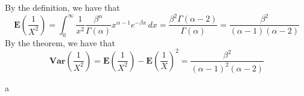 \documentclass[10.5pt]{article}
\begin{document}
\subsection{}
By the definition, we have that $$\mathbf{E}\left(\frac{1}{X^2}\right)=\int_0^{\infty}\frac{1}{x^2}\frac{\beta^\alpha}{\Gamma(\alpha)}x^{\alpha-1}e^{-\beta x}\,dx=\frac{\beta^2\Gamma(\alpha-2)}{\Gamma(\alpha)}=\frac{\beta^2}{(\alpha-1)(\alpha-2)}$$\indent
By the theorem, we have that $$\mathbf{Var}\left(\frac{1}{X^2}\right)=\mathbf{E}\left(\frac{1}{X^2}\right)-\mathbf{E}\left(\frac{1}{X}\right)^2=\frac{\beta^2}{(\alpha-1)^2(\alpha-2)}$$

\newpage
a
\end{document}
